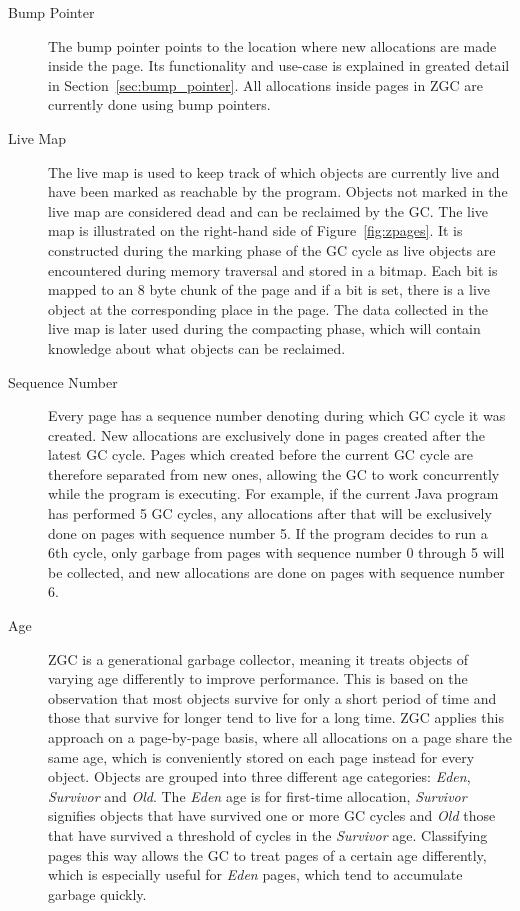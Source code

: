 \begin{description}
    \item[Bump Pointer]
        The bump pointer points to the location where new allocations are made inside the page. Its functionality and use-case is explained in greated detail in Section~\ref{sec:bump_pointer}. All allocations inside pages in ZGC are currently done using bump pointers.

    \item[Live Map]
        The live map is used to keep track of which objects are currently live and have been marked as reachable by the program. Objects not marked in the live map are considered dead and can be reclaimed by the GC. The live map is illustrated on the right-hand side of Figure~\ref{fig:zpages}. It is constructed during the marking phase of the GC cycle as live objects are encountered during memory traversal and stored in a bitmap. Each bit is mapped to an 8 byte chunk of the page and if a bit is set, there is a live object at the corresponding place in the page. The data collected in the live map is later used during the compacting phase, which will contain knowledge about what objects can be reclaimed.

        \newpage
    \item[Sequence Number]
        Every page has a sequence number denoting during which GC cycle it was created. New allocations are exclusively done in pages created after the latest GC cycle. Pages which created before the current GC cycle are therefore separated from new ones, allowing the GC to work concurrently while the program is executing. For example, if the current Java program has performed 5 GC cycles, any allocations after that will be exclusively done on pages with sequence number 5. If the program decides to run a 6th cycle, only garbage from pages with sequence number 0 through 5 will be collected, and new allocations are done on pages with sequence number 6.

    \item[Age]
        ZGC is a generational garbage collector, meaning it treats objects of varying age differently to improve performance. This is based on the observation that most objects survive for only a short period of time and those that survive for longer tend to live for a long time. ZGC applies this approach on a page-by-page basis, where all allocations on a page share the same age, which is conveniently stored on each page instead for every object. Objects are grouped into three different age categories: \textit{Eden}, \textit{Survivor} and \textit{Old}. The \textit{Eden} age is for first-time allocation, \textit{Survivor} signifies objects that have survived one or more GC cycles and \textit{Old} those that have survived a threshold of cycles in the \textit{Survivor} age. Classifying pages this way allows the GC to treat pages of a certain age differently, which is especially useful for \textit{Eden} pages, which tend to accumulate garbage quickly.
\end{description}

